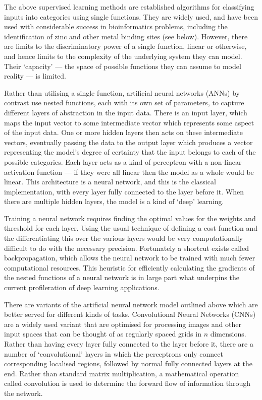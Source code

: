 The above supervised learning methods are established algorithms for classifying inputs into categories using single functions. They are widely used, and have been used with considerable success in bioinformatics problems, including the identification of zinc and other metal binding sites (see below). However, there are limits to the discriminatory power of a single function, linear or otherwise, and hence limits to the complexity of the underlying system they can model. Their `capacity' --- the space of possible functions they can assume to model reality --- is limited.

Rather than utilising a single function, artificial neural networks (ANNs) by contrast use nested functions, each with its own set of parameters, to capture different layers of abstraction in the input data. There is an input layer, which maps the input vector to some intermediate vector which represents some aspect of the input data. One or more hidden layers then acts on these intermediate vectors, eventually passing the data to the output layer which produces a vector representing the model's degree of certainty that the input belongs to each of the possible categories. Each layer acts as a kind of perceptron with a non-linear activation function --- if they were all linear then the model as a whole would be linear. This architecture is a neural network, and this is the classical implementation, with every layer fully connected to the layer before it. When there are multiple hidden layers, the model is a kind of `deep' learning.

Training a neural network requires finding the optimal values for the weights and threshold for each layer. Using the usual technique of defining a cost function and the differentiating this over the various layers would be very computationally difficult to do with the necessary precision. Fortunately a shortcut exists called backpropagation, which allows the neural network to be trained with much fewer computational resources. This heuristic for efficiently calculating the gradients of the nested functions of a neural network is in large part what underpins the current profileration of deep learning applications.

There are variants of the artificial neural network  model outlined above which are better served for different kinds of tasks. Convolutional Neural Networks (CNNs) are a widely used variant that are optimised for processing images and other input spaces that can be thought of as regularly spaced grids in $n$ dimensions. Rather than having every layer fully connected to the layer before it, there are a number of `convolutional' layers in which the perceptrons only connect corresponding localised regions, followed by normal fully connected layers at the end. Rather than standard matrix multiplication, a mathematical operation called convolution is used to determine the forward flow of information through the network.

